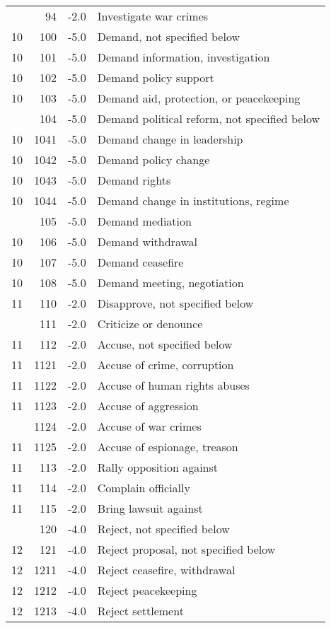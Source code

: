 \documentclass[10pt,]{article}
\begin{document}
\begin{longtable}[t]{rrrl}
\addlinespace
9 & 94 & -2.0 & Investigate war crimes\\
10 & 100 & -5.0 & Demand, not specified below\\
10 & 101 & -5.0 & Demand information, investigation\\
10 & 102 & -5.0 & Demand policy support\\
10 & 103 & -5.0 & Demand aid, protection, or peacekeeping\\
\addlinespace
10 & 104 & -5.0 & Demand political reform, not specified below\\
10 & 1041 & -5.0 & Demand change in leadership\\
10 & 1042 & -5.0 & Demand policy change\\
10 & 1043 & -5.0 & Demand rights\\
10 & 1044 & -5.0 & Demand change in institutions, regime\\
\addlinespace
10 & 105 & -5.0 & Demand mediation\\
10 & 106 & -5.0 & Demand withdrawal\\
10 & 107 & -5.0 & Demand ceasefire\\
10 & 108 & -5.0 & Demand meeting, negotiation\\
11 & 110 & -2.0 & Disapprove, not specified below\\
\addlinespace
11 & 111 & -2.0 & Criticize or denounce\\
11 & 112 & -2.0 & Accuse, not specified below\\
11 & 1121 & -2.0 & Accuse of crime, corruption\\
11 & 1122 & -2.0 & Accuse of human rights abuses\\
11 & 1123 & -2.0 & Accuse of aggression\\
\addlinespace
11 & 1124 & -2.0 & Accuse of war crimes\\
11 & 1125 & -2.0 & Accuse of espionage, treason\\
11 & 113 & -2.0 & Rally opposition against\\
11 & 114 & -2.0 & Complain officially\\
11 & 115 & -2.0 & Bring lawsuit against\\
\addlinespace
12 & 120 & -4.0 & Reject, not specified below\\
12 & 121 & -4.0 & Reject proposal, not specified below\\
12 & 1211 & -4.0 & Reject ceasefire, withdrawal\\
12 & 1212 & -4.0 & Reject peacekeeping\\
12 & 1213 & -4.0 & Reject settlement\\

\end{longtable}
\end{document}
